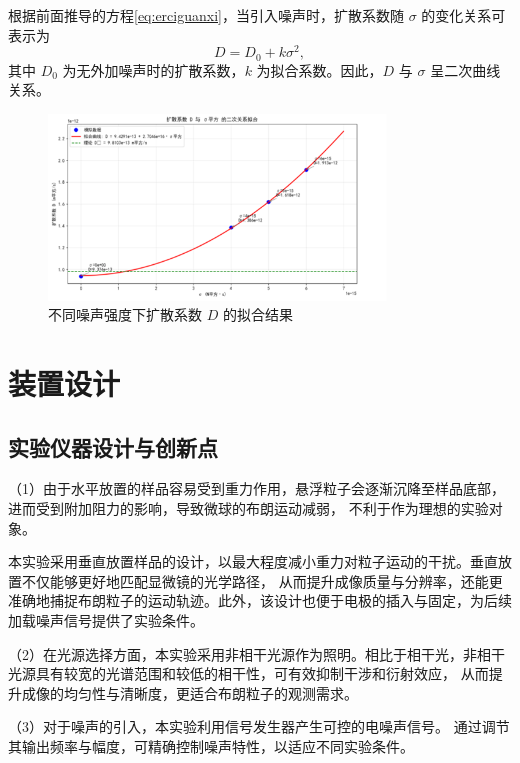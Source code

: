 \documentclass[a4paper]{report} %
\begin{document}
根据前面推导的方程\eqref{eq:erciguanxi}，当引入噪声时，扩散系数随 $\sigma$ 的变化关系可表示为
\begin{equation}
  D = D_0 + k\sigma^2,
  \label{eq:D_sigma}
\end{equation}
其中 $D_0$ 为无外加噪声时的扩散系数，$k$ 为拟合系数。因此，$D$ 与 $\sigma$ 呈二次曲线关系。

\begin{figure}[H]
  \centering
  \includegraphics[width=0.8\textwidth]{fit.png}
  \caption{不同噪声强度下扩散系数 $D$ 的拟合结果}
  \label{fig:fit}
\end{figure}


\chapter{装置设计}
\section{实验仪器设计与创新点}
（1）由于水平放置的样品容易受到重力作用，悬浮粒子会逐渐沉降至样品底部，进而受到附加阻力的影响，导致微球的布朗运动减弱，
不利于作为理想的实验对象\cite{einstein1905,dhont1996brownian}。\par
本实验采用垂直放置样品的设计，以最大程度减小重力对粒子运动的干扰。垂直放置不仅能够更好地匹配显微镜的光学路径，
从而提升成像质量与分辨率，还能更准确地捕捉布朗粒子的运动轨迹。此外，该设计也便于电极的插入与固定，为后续加载噪声信号提供了实验条件。\par

（2）在光源选择方面，本实验采用非相干光源作为照明。相比于相干光，非相干光源具有较宽的光谱范围和较低的相干性，可有效抑制干涉和衍射效应，
从而提升成像的均匀性与清晰度，更适合布朗粒子的观测需求\cite{goodman,mandel1995optical}。\par

（3）对于噪声的引入，本实验利用信号发生器产生可控的电噪声信号。
通过调节其输出频率与幅度，可精确控制噪声特性，以适应不同实验条件\cite{horowitz1989art,schreiber1999electrical}。\par
\end{document}
